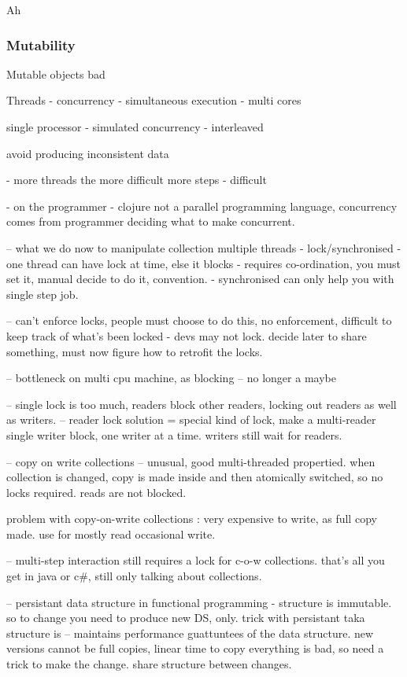 \documentclass[12pt,a4paper]{article}
\begin{document}
Ah \cite{theConcurrencyChallenge} \cite{concurrencyChallenges} \cite{theConcurrencyChallenge}


\subsubsection{Mutability}

Mutable objects bad

Threads - concurrency - simultaneous execution - multi cores 

single processor - simulated concurrency - interleaved

avoid producing inconsistent data 

- more threads the more difficult more steps - difficult

- on the programmer - clojure not a parallel programming language, concurrency comes from programmer deciding what to make concurrent.

-- what we do now to manipulate collection multiple threads
- lock/synchronised
- one thread can have lock at time, else it blocks
- requires co-ordination, you must set it, manual decide to do it, convention.
- synchronised can only help you with single step job.

-- can't enforce locks, people must choose to do this, no enforcement, difficult to keep track of what's been locked - devs may not lock. decide later to share something, must now figure how to retrofit the locks.

-- bottleneck on multi cpu machine, as blocking -- no longer a maybe

-- single lock is too much, readers block other readers, locking out readers as well as writers.
-- reader lock solution = special kind of lock, make a multi-reader single writer block, one writer at a time. writers still wait for readers.

-- copy on write collections -- unusual, good multi-threaded propertied. when collection is changed, copy is made inside and then atomically switched, so no locks required. reads are not blocked.

problem with copy-on-write collections : very expensive to write, as full copy made. use for mostly read occasional write.

-- multi-step interaction still requires a lock for c-o-w collections. that's all you get in java or c\#, still only talking about collections.

-- persistant data structure in functional programming - structure is immutable. so to change you need to produce new DS, only. trick with persistant taka structure is -- maintains performance guattuntees of the data structure. new versions cannot be full copies, linear time to copy everything is bad, so need a trick to make the change. share structure between changes. 
\end{document}
